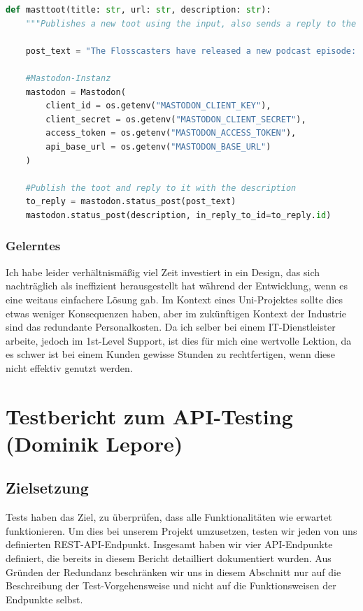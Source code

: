\documentclass{article}
\begin{document}
\begin{lstlisting}[language=Python, caption=Vollständige Funktion des \textit{Autotootings}]
def masttoot(title: str, url: str, description: str):
    """Publishes a new toot using the input, also sends a reply to the announcement with the description."""

    post_text = "The Flosscasters have released a new podcast episode: " + title + ". Check it out @ " + url

    #Mastodon-Instanz
    mastodon = Mastodon(
        client_id = os.getenv("MASTODON_CLIENT_KEY"),
        client_secret = os.getenv("MASTODON_CLIENT_SECRET"),
        access_token = os.getenv("MASTODON_ACCESS_TOKEN"),
        api_base_url = os.getenv("MASTODON_BASE_URL")
    )

    #Publish the toot and reply to it with the description
    to_reply = mastodon.status_post(post_text)
    mastodon.status_post(description, in_reply_to_id=to_reply.id)
\end{lstlisting}

\subsubsection{Gelerntes}

Ich habe leider verhältnismäßig viel Zeit investiert in ein Design, das sich nachträglich als ineffizient herausgestellt hat während der Entwicklung, wenn es eine weitaus einfachere Lösung gab. Im Kontext eines Uni-Projektes sollte dies etwas weniger Konsequenzen haben, aber im zukünftigen Kontext der Industrie sind das redundante Personalkosten. Da ich selber bei einem IT-Dienstleister arbeite, jedoch im 1st-Level Support, ist dies für mich eine wertvolle Lektion, da es schwer ist bei einem Kunden gewisse Stunden zu rechtfertigen, wenn diese nicht effektiv genutzt werden.

\section{Testbericht zum API-Testing \small{(Dominik Lepore)}}
\subsection{Zielsetzung}

Tests haben das Ziel, zu überprüfen, dass alle Funktionalitäten wie erwartet funktionieren. Um dies bei unserem Projekt umzusetzen, testen wir jeden von uns definierten REST-API-Endpunkt. Insgesamt haben wir vier API-Endpunkte definiert, die bereits in diesem Bericht detailliert dokumentiert wurden. Aus Gründen der Redundanz beschränken wir uns in diesem Abschnitt nur auf die Beschreibung der Test-Vorgehensweise und nicht auf die Funktionsweisen der Endpunkte selbst. 
\end{document}
